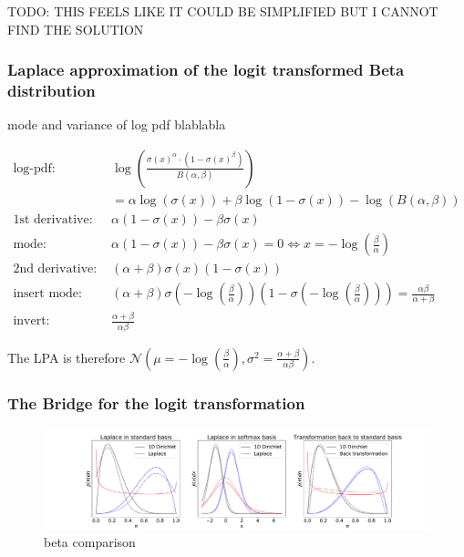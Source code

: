 TODO: THIS FEELS LIKE IT COULD BE SIMPLIFIED BUT I CANNOT FIND THE SOLUTION

\subsubsection{Laplace approximation of the logit transformed Beta distribution}

mode and variance of log pdf blablabla

\begin{align*}
\text{log-pdf: } &\log\left( \frac{\sigma(x)^{\alpha} \cdot (1 - \sigma(x)^{\beta})}{B(\alpha, \beta)} \right) \\
&= \alpha \log(\sigma(x)) + \beta \log(1 - \sigma(x)) - \log(B(\alpha, \beta))\\
\text{1st derivative: }&  \alpha (1 - \sigma(x)) - \beta \sigma(x)\\
\text{mode: }& \alpha (1 - \sigma(x)) - \beta \sigma(x) = 0 \Leftrightarrow x = -\log(\frac{\beta}{\alpha}) \\
\text{2nd derivative: }& (\alpha + \beta)\sigma(x)(1 - \sigma(x))  \\
\text{insert mode: }& (\alpha + \beta)\sigma(-\log(\frac{\beta}{\alpha}))(1 - \sigma(-\log(\frac{\beta}{\alpha}))) = \frac{\alpha\beta}{\alpha + \beta}  \\
\text{invert: }& \frac{\alpha + \beta}{\alpha \beta}
\end{align*}


The LPA is therefore $\mathcal{N}(\mu=-\log(\frac{\beta}{\alpha}), \sigma^2 = \frac{\alpha + \beta}{\alpha \beta})$.

\subsubsection{The Bridge for the logit transformation}


\begin{figure}[!htb]
	\centering
	\includegraphics[width=\textwidth]{figures/beta_playground.pdf}
	\caption{beta comparison}
	\label{fig:beta_comparison}
\end{figure}